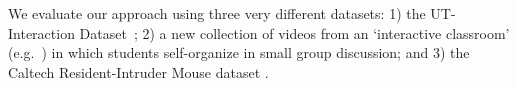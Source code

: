 We evaluate our approach using three very different datasets: 1) the UT-Interaction Dataset~\cite{Ryoo:group}; 2) a new collection of videos from an `interactive classroom' (e.g.~\cite{Crouch:PI}) in which students self-organize in small group discussion; and 3) the Caltech Resident-Intruder Mouse dataset \cite{CRIM13}.


